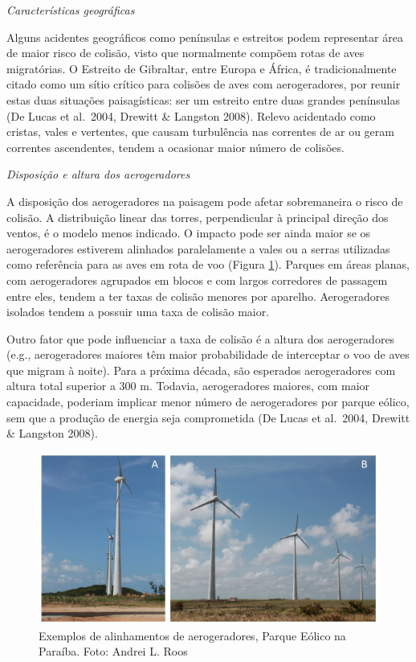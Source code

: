 \documentclass[
  oneside]{scrbook}
\begin{document}
\emph{Características geográficas}

Alguns acidentes geográficos como penínsulas e estreitos podem representar área de maior risco de colisão, visto que normalmente compõem rotas de aves migratórias. O Estreito de Gibraltar, entre Europa e África, é tradicionalmente citado como um sítio crítico para colisões de aves com aerogeradores, por reunir estas duas situações paisagísticas: ser um estreito entre duas grandes penínsulas (De Lucas et al.~2004, Drewitt \& Langston 2008). Relevo acidentado como cristas, vales e vertentes, que causam turbulência nas correntes de ar ou geram correntes ascendentes, tendem a ocasionar maior número de colisões.

\emph{Disposição e altura dos aerogeradores}

A disposição dos aerogeradores na paisagem pode afetar sobremaneira o risco de colisão. A distribuição linear das torres, perpendicular à principal direção dos ventos, é o modelo menos indicado. O impacto pode ser ainda maior se os aerogeradores estiverem alinhados paralelamente a vales ou a serras utilizadas como referência para as aves em rota de voo (Figura \ref{fig:13}). Parques em áreas planas, com aerogeradores agrupados em blocos e com largos corredores de passagem entre eles, tendem a ter taxas de colisão menores por aparelho. Aerogeradores isolados tendem a possuir uma taxa de colisão maior.

Outro fator que pode influenciar a taxa de colisão é a altura dos aerogeradores (e.g., aerogeradores maiores têm maior probabilidade de interceptar o voo de aves que migram à noite). Para a próxima década, são esperados aerogeradores com altura total superior a 300 m. Todavia, aerogeradores maiores, com maior capacidade, poderiam implicar menor número de aerogeradores por parque eólico, sem que a produção de energia seja comprometida (De Lucas et al.~2004, Drewitt \& Langston 2008).

\begin{figure}[H]

{\centering \includegraphics[width=0.75\linewidth]{imagens/cap04/Figura_4.2ab} 

}

\caption{Exemplos de alinhamentos de aerogeradores, Parque Eólico na Paraíba. Foto: Andrei L. Roos}\label{fig:13}
\end{figure}
\end{document}
